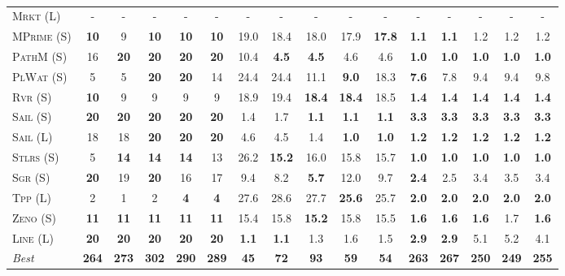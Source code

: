 \documentclass[11pt,landscape]{article}
\begin{document}
\begin{table*}[tb]
{\begin{tabular}{|l||ccccc||ccccc||ccccc||}
\textsc{Mrkt} (L)&-&-&-&-&-&-&-&-&-&-&-&-&-&-&-\\
\textsc{MPrime} (S)&\textbf{10}&9&\textbf{10}&\textbf{10}&\textbf{10}&19.0&18.4&18.0&17.9&\textbf{17.8}&\textbf{1.1}&\textbf{1.1}&1.2&1.2&1.2\\
\textsc{PathM} (S)&16&\textbf{20}&\textbf{20}&\textbf{20}&\textbf{20}&10.4&\textbf{4.5}&\textbf{4.5}&4.6&4.6&\textbf{1.0}&\textbf{1.0}&\textbf{1.0}&\textbf{1.0}&\textbf{1.0}\\
\textsc{PlWat} (S)&5&5&\textbf{20}&\textbf{20}&14&24.4&24.4&11.1&\textbf{9.0}&18.3&\textbf{7.6}&7.8&9.4&9.4&9.8\\
\textsc{Rvr} (S)&\textbf{10}&9&9&9&9&18.9&19.4&\textbf{18.4}&\textbf{18.4}&18.5&\textbf{1.4}&\textbf{1.4}&\textbf{1.4}&\textbf{1.4}&\textbf{1.4}\\
\textsc{Sail} (S)&\textbf{20}&\textbf{20}&\textbf{20}&\textbf{20}&\textbf{20}&1.4&1.7&\textbf{1.1}&\textbf{1.1}&\textbf{1.1}&\textbf{3.3}&\textbf{3.3}&\textbf{3.3}&\textbf{3.3}&\textbf{3.3}\\
\textsc{Sail} (L)&18&18&\textbf{20}&\textbf{20}&\textbf{20}&4.6&4.5&1.4&\textbf{1.0}&\textbf{1.0}&\textbf{1.2}&\textbf{1.2}&\textbf{1.2}&\textbf{1.2}&\textbf{1.2}\\
\textsc{Stlrs} (S)&5&\textbf{14}&\textbf{14}&\textbf{14}&13&26.2&\textbf{15.2}&16.0&15.8&15.7&\textbf{1.0}&\textbf{1.0}&\textbf{1.0}&\textbf{1.0}&\textbf{1.0}\\
\textsc{Sgr} (S)&\textbf{20}&19&\textbf{20}&16&17&9.4&8.2&\textbf{5.7}&12.0&9.7&\textbf{2.4}&2.5&3.4&3.5&3.4\\
\textsc{Tpp} (L)&2&1&2&\textbf{4}&\textbf{4}&27.6&28.6&27.7&\textbf{25.6}&25.7&\textbf{2.0}&\textbf{2.0}&\textbf{2.0}&\textbf{2.0}&\textbf{2.0}\\
\textsc{Zeno} (S)&\textbf{11}&\textbf{11}&\textbf{11}&\textbf{11}&\textbf{11}&15.4&15.8&\textbf{15.2}&15.8&15.5&\textbf{1.6}&\textbf{1.6}&\textbf{1.6}&1.7&\textbf{1.6}\\
\textsc{Line} (L)&\textbf{20}&\textbf{20}&\textbf{20}&\textbf{20}&\textbf{20}&\textbf{1.1}&\textbf{1.1}&1.3&1.6&1.5&\textbf{2.9}&\textbf{2.9}&5.1&5.2&4.1
\\\hline
\textit{Best}&\textbf{264}&\textbf{273}&\textbf{302}&\textbf{290}&\textbf{289}&\textbf{45}&\textbf{72}&\textbf{93}&\textbf{59}&\textbf{54}&\textbf{263}&\textbf{267}&\textbf{250}&\textbf{249}&\textbf{255}\\\hline

        \end{tabular}}
        \caption{}
        \label{tab:all-patty}
        \end{table*}
        
\end{document}
